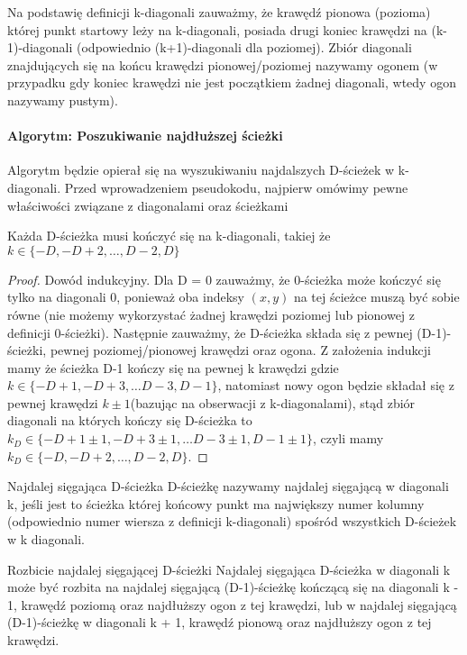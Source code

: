 Na podstawię definicji k-diagonali zauważmy, że krawędź pionowa (pozioma) której punkt startowy leży na k-diagonali, posiada drugi koniec krawędzi na (k-1)-diagonali (odpowiednio (k+1)-diagonali dla poziomej). Zbiór diagonali znajdujących się na końcu krawędzi pionowej/poziomej nazywamy ogonem (w przypadku gdy koniec krawędzi nie jest początkiem żadnej diagonali, wtedy ogon nazywamy pustym).

\paragraph{Algorytm: Poszukiwanie najdłuższej ścieżki}
Algorytm będzie opierał się na wyszukiwaniu najdalszych D-ścieżek w k-diagonali. Przed wprowadzeniem pseudokodu, najpierw omówimy pewne właściwości związane z diagonalami oraz ścieżkami

\begin{lemma}{}{}
Każda D-ścieżka musi kończyć się na k-diagonali, takiej że $k \in \{-D, -D + 2, \dots, D-2, D\}$
\end{lemma}

\begin{proof}
Dowód indukcyjny. Dla D = 0 zauważmy, że 0-ścieżka może kończyć się tylko na diagonali 0, ponieważ oba indeksy $(x,y)$ na tej ścieżce muszą być sobie równe (nie możemy wykorzystać żadnej krawędzi poziomej lub pionowej z definicji 0-ścieżki). Następnie zauważmy, że D-ścieżka składa się z pewnej (D-1)-ścieżki, pewnej poziomej/pionowej krawędzi oraz ogona. Z założenia indukcji mamy że ścieżka D-1 kończy się na pewnej k krawędzi gdzie $k \in \{ -D+1, -D + 3, \dots D -3, D - 1\}$, natomiast nowy ogon będzie składał się z pewnej krawędzi $k \pm 1$(bazując na obserwacji z k-diagonalami), stąd zbiór diagonali na których kończy się D-ścieżka to $k_{D} \in \{ -D + 1 \pm 1, -D + 3\pm 1, \dots D -3\pm 1, D - 1\pm 1\}$, czyli mamy $k_{D} \in \{ -D, -D + 2, \dots, D - 2, D\}$.
\end{proof}

\begin{definition}{}{Najdalej sięgająca D-ścieżka}
D-ścieżkę nazywamy najdalej sięgającą w diagonali k, jeśli jest to ścieżka której końcowy punkt ma największy numer kolumny (odpowiednio numer wiersza z definicji k-diagonali) spośród wszystkich D-ścieżek w k diagonali.
\end{definition}

\begin{lemma}{}{Rozbicie najdalej sięgającej D-ścieżki}
Najdalej sięgająca D-ścieżka w diagonali k może być rozbita na najdalej sięgającą (D-1)-ścieżkę kończącą się na diagonali k - 1, krawędź poziomą oraz najdłuższy ogon z tej krawędzi, lub w najdalej sięgającą (D-1)-ścieżkę w diagonali k + 1, krawędź pionową oraz najdłuższy ogon z tej krawędzi.
\end{lemma}

